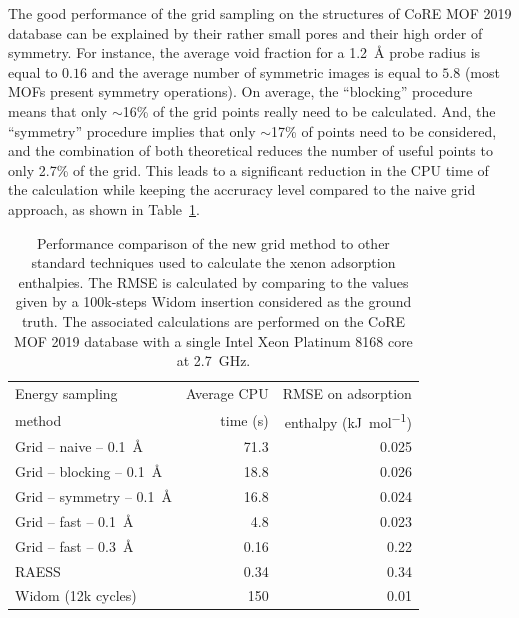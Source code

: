 \documentclass[main]{subfiles}
\begin{document}
The good performance of the grid sampling on the structures of CoRE MOF 2019 database can be explained by their rather small pores and their high order of symmetry. For instance, the average void fraction for a \SI{1.2}{\angstrom} probe radius is equal to $0.16$ and the average number of symmetric images is equal to $5.8$ (most MOFs present symmetry operations). On average, the ``blocking'' procedure means that only {$\sim$16\%} of the grid points really need to be calculated. And, the ``symmetry'' procedure implies that only {$\sim$17\%} of points need to be considered, and the combination of both theoretical reduces the number of useful points to only {2.7\%} of the grid. This leads to a significant reduction in the CPU time of the calculation while keeping the accruracy level compared to the naive grid approach, as shown in Table~\ref{tab:grid}.

\setlength{\extrarowheight}{0.1cm}
\begin{table}[ht]
  \centering
  \begin{tabular}{|l|r|r|}
    \hline
    Energy sampling  &  Average CPU & RMSE on adsorption  \\
    method &  time (s)  &  enthalpy (\si{\kilo\joule\per\mole}) \\[0.5mm]
    \hline
    Grid -- naive -- \SI{0.1}{\angstrom} &  71.3 & 0.025  \\[0.5mm]
    Grid -- blocking -- \SI{0.1}{\angstrom} &  18.8 & 0.026  \\
    Grid -- symmetry -- \SI{0.1}{\angstrom} &  16.8 & 0.024  \\
    Grid -- fast -- \SI{0.1}{\angstrom} &  4.8 & 0.023  \\
    Grid -- fast -- \SI{0.3}{\angstrom} &  0.16 & 0.22  \\
    RAESS\cite{Ren_2023}  &  0.34 & 0.34  \\
    Widom\cite{Widom1963} (12k cycles) &  150 & 0.01  \\
    \hline
  \end{tabular}
  \caption{Performance comparison of the new grid method to other standard techniques used to calculate the xenon adsorption enthalpies. The RMSE is calculated by comparing to the values given by a 100k-steps Widom insertion considered as the ground truth. The associated calculations are performed on the CoRE MOF 2019 database with a single Intel Xeon Platinum 8168 core at 2.7~GHz.}\label{tab:grid}
\end{table}
\end{document}
